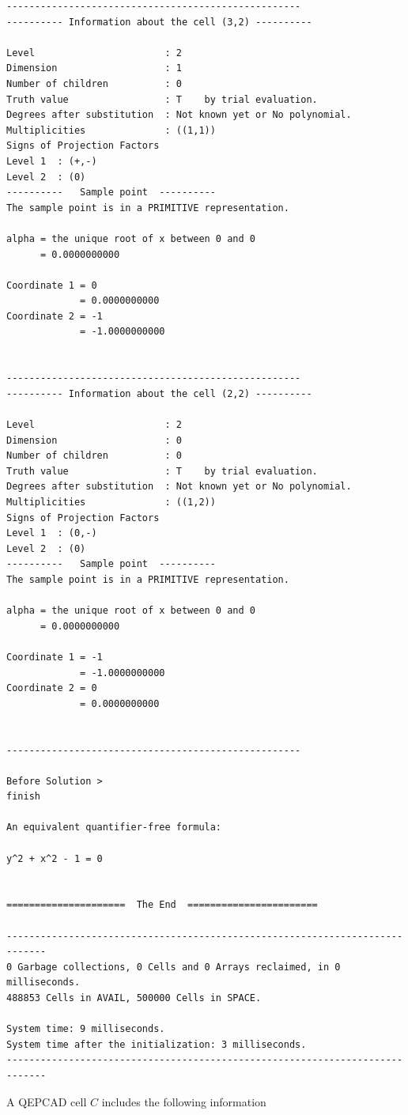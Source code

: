 \documentclass[
]{book}
\theoremstyle{definition}
\theoremstyle{definition}
\theoremstyle{definition}
\theoremstyle{definition}
\theoremstyle{remark}
\begin{document}
\begin{verbatim}
----------------------------------------------------
---------- Information about the cell (3,2) ----------

Level                       : 2
Dimension                   : 1
Number of children          : 0
Truth value                 : T    by trial evaluation.
Degrees after substitution  : Not known yet or No polynomial.
Multiplicities              : ((1,1))
Signs of Projection Factors
Level 1  : (+,-)
Level 2  : (0)
----------   Sample point  ----------
The sample point is in a PRIMITIVE representation.

alpha = the unique root of x between 0 and 0
      = 0.0000000000

Coordinate 1 = 0
             = 0.0000000000
Coordinate 2 = -1
             = -1.0000000000


----------------------------------------------------
---------- Information about the cell (2,2) ----------

Level                       : 2
Dimension                   : 0
Number of children          : 0
Truth value                 : T    by trial evaluation.
Degrees after substitution  : Not known yet or No polynomial.
Multiplicities              : ((1,2))
Signs of Projection Factors
Level 1  : (0,-)
Level 2  : (0)
----------   Sample point  ----------
The sample point is in a PRIMITIVE representation.

alpha = the unique root of x between 0 and 0
      = 0.0000000000

Coordinate 1 = -1
             = -1.0000000000
Coordinate 2 = 0
             = 0.0000000000


----------------------------------------------------

Before Solution >
finish

An equivalent quantifier-free formula:

y^2 + x^2 - 1 = 0


=====================  The End  =======================

-----------------------------------------------------------------------------
0 Garbage collections, 0 Cells and 0 Arrays reclaimed, in 0 milliseconds.
488853 Cells in AVAIL, 500000 Cells in SPACE.

System time: 9 milliseconds.
System time after the initialization: 3 milliseconds.
-----------------------------------------------------------------------------
\end{verbatim}

A QEPCAD cell \(C\) includes the following information
\end{document}
